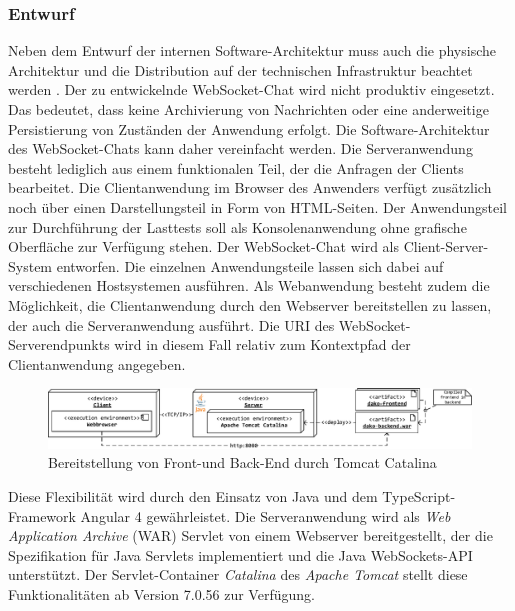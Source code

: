 \documentclass[11pt,a4paper,titlepage]{scrartcl}
\numberwithin{equation}{section}
\begin{document}
\subsubsection{Entwurf}
Neben dem Entwurf der internen Software-Architektur muss auch die physische Architektur und die Distribution auf der technischen Infrastruktur beachtet werden \autocite[6]{balzert_lehrbuch_2011}. Der zu entwickelnde WebSocket-Chat wird nicht produktiv eingesetzt. Das bedeutet, dass keine Archivierung von Nachrichten oder eine anderweitige Persistierung von Zuständen der Anwendung erfolgt. Die Software-Architektur des WebSocket-Chats kann daher vereinfacht werden. Die Serveranwendung besteht lediglich aus einem funktionalen Teil, der die Anfragen der Clients bearbeitet. Die Clientanwendung im Browser des Anwenders verfügt zusätzlich noch über einen Darstellungsteil in Form von HTML-Seiten. Der Anwendungsteil zur Durchführung der Lasttests soll als Konsolenanwendung ohne grafische Oberfläche zur Verfügung stehen.
Der WebSocket-Chat wird als Client-Server-System entworfen. Die einzelnen Anwendungsteile lassen sich dabei auf verschiedenen Hostsystemen ausführen. Als Webanwendung besteht zudem die Möglichkeit, die Clientanwendung durch den Webserver bereitstellen zu lassen, der auch die Serveranwendung ausführt. Die URI des WebSocket-Serverendpunkts wird in diesem Fall relativ zum Kontextpfad der Clientanwendung angegeben. \\

\medskip
\begin{figure}[ht] 
	\begin{center}
		\includegraphics[scale=0.7]{img/vtfinb.pdf}
		\caption{Bereitstellung von Front-und Back-End durch Tomcat Catalina}
		\label{fig:Verteilung1}
	\end{center}
\end{figure}

\noindent Diese Flexibilität wird durch den Einsatz von Java und dem TypeScript-Framework Angular 4 gewährleistet. Die Serveranwendung wird als \textit{Web Application Archive} (WAR) Servlet von einem Webserver bereitgestellt, der die Spezifikation für Java Servlets implementiert und die Java WebSockets-API unterstützt. Der Servlet-Container \textit{Catalina} des \textit{Apache Tomcat} stellt diese Funktionalitäten ab Version 7.0.56 zur Verfügung.\\
\end{document}
